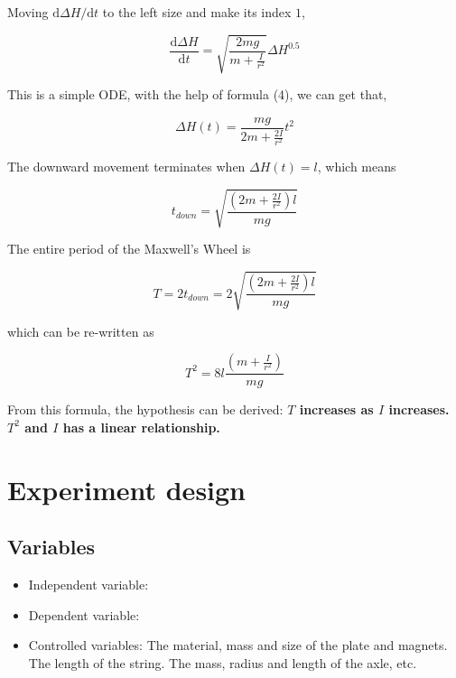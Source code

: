 \documentclass[a4paper]{article}
\begin{document}
Moving ${\mathrm{d}\Delta H}/{\mathrm{d}t}$ to the left size and make its index $1$,

\begin{equation}
    \dfrac{\mathrm{d}\Delta H}{\mathrm{d}t} = \sqrt{\frac{2mg}{m+\frac{I}{r^2}}} \Delta H ^ {0.5}
\end{equation}

This is a simple ODE, with the help of formula (4), we can get that,

\begin{equation}
    \Delta H(t) = \dfrac{mg}{2m+\frac{2I}{r^2}} t^2
\end{equation}

The downward movement terminates when $\Delta H(t) = l$, which means 

\begin{equation}
    t_{down} = \sqrt{\dfrac{(2m+\frac{2I}{r^2})l}{mg}}
\end{equation}

The entire period of the Maxwell's Wheel is 

\begin{equation}
    T = 2t_{down} = 2\sqrt{\dfrac{(2m+\frac{2I}{r^2})l}{mg}}
\end{equation}

which can be re-written as 

\begin{equation}
    T^2 = 8l\dfrac{(m+\frac{I}{r^2})}{mg}
\end{equation}

From this formula, the hypothesis can be derived: \textbf{$T$ increases as $I$ increases. $T^2$ and $I$ has a linear relationship.}

\section{Experiment design}

\subsection{Variables} 

\begin{itemize}
    \item Independent variable: 
    \item Dependent variable: 
    \item Controlled variables: The material, mass and size of the plate and magnets. The length of the string. The mass, radius and length of the axle, etc.
\end{itemize}
\end{document}
